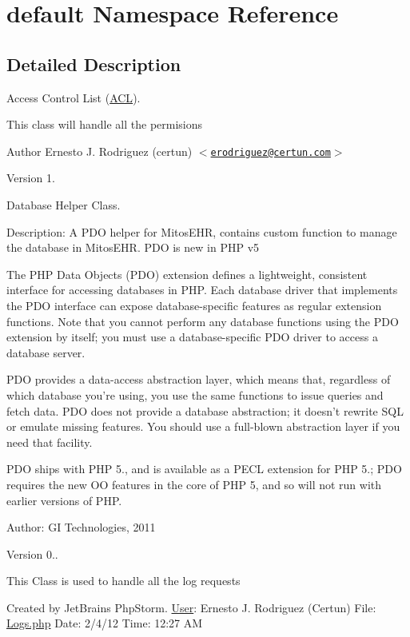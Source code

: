 \hypertarget{namespacedefault}{\section{default \-Namespace \-Reference}
\label{namespacedefault}
}


\subsection{\-Detailed \-Description}
\-Access \-Control \-List (\hyperlink{class_a_c_l}{\-A\-C\-L}).

\-This class will handle all the permisions \begin{DoxyAuthor}{\-Author}
\-Ernesto \-J. \-Rodriguez (certun) $<$\href{mailto:erodriguez@certun.com}{\tt erodriguez@certun.\-com}$>$ 
\end{DoxyAuthor}
\begin{DoxyVersion}{\-Version}
1.
\end{DoxyVersion}
\-Database \-Helper \-Class.

\-Description\-: \-A \-P\-D\-O helper for \-Mitos\-E\-H\-R, contains custom function to manage the database in \-Mitos\-E\-H\-R. \-P\-D\-O is new in \-P\-H\-P v5

\-The \-P\-H\-P \-Data \-Objects (\-P\-D\-O) extension defines a lightweight, consistent interface for accessing databases in \-P\-H\-P. \-Each database driver that implements the \-P\-D\-O interface can expose database-\/specific features as regular extension functions. \-Note that you cannot perform any database functions using the \-P\-D\-O extension by itself; you must use a database-\/specific \-P\-D\-O driver to access a database server.

\-P\-D\-O provides a data-\/access abstraction layer, which means that, regardless of which database you're using, you use the same functions to issue queries and fetch data. \-P\-D\-O does not provide a database abstraction; it doesn't rewrite \-S\-Q\-L or emulate missing features. \-You should use a full-\/blown abstraction layer if you need that facility.

\-P\-D\-O ships with \-P\-H\-P 5., and is available as a \-P\-E\-C\-L extension for \-P\-H\-P 5.; \-P\-D\-O requires the new \-O\-O features in the core of \-P\-H\-P 5, and so will not run with earlier versions of \-P\-H\-P.

\-Author\-: \-G\-I \-Technologies, 2011

\begin{DoxyVersion}{\-Version}
0..
\end{DoxyVersion}
\-This \-Class is used to handle all the log requests

\-Created by \-Jet\-Brains \-Php\-Storm. \hyperlink{class_user}{\-User}\-: \-Ernesto \-J. \-Rodriguez (\-Certun) \-File\-: \hyperlink{_logs_8php}{\-Logs.\-php} \-Date\-: 2/4/12 \-Time\-: 12\-:27 \-A\-M 